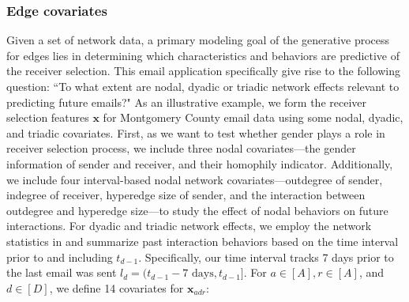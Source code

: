 \documentclass[ba]{imsart}
\numberwithin{equation}{section}
\theoremstyle{plain}
\begin{document}
 	   \subsubsection{Edge covariates}
 	   Given a set of network data, a primary modeling goal of the generative process for edges lies in determining which characteristics and behaviors are predictive of the receiver selection. This email application specifically give rise to the following question: ``To what extent are nodal, dyadic or triadic network effects relevant to predicting future emails?" As an illustrative example, we form the receiver selection features $\boldsymbol{x}$ for Montgomery County email data using some nodal, dyadic, and triadic covariates. First, as we want to test whether gender plays a role in receiver selection process, we include three nodal covariates---the gender information of sender and receiver, and their homophily indicator. Additionally, we include four interval-based nodal network covariates---outdegree of sender, indegree of receiver, hyperedge size of sender, and the interaction between outdegree and hyperedge size---to study the effect of nodal behaviors on future interactions. For dyadic and triadic network effects, we employ the network statistics in \cite{PerryWolfe2012} and summarize past interaction behaviors based on the time interval prior to and including $t_{d-1}$. Specifically, our time interval tracks 7 days prior to the last email was sent $l_d = (t_{d-1}-7\mbox{ days}, t_{d-1}]$. For $a \in [A], r \in [A]$, and $d \in [D]$, we define 14 covariates for $\boldsymbol{x}_{adr}$:
\end{document}

